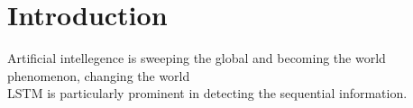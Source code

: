 \section{Introduction}
Artificial intellegence is sweeping the global and becoming the world phenomenon, changing the world 
\\
LSTM is particularly prominent in detecting the sequential information. 